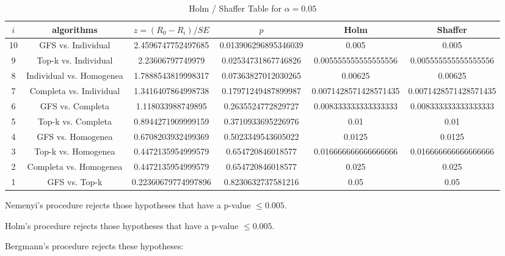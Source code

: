 \documentclass[a4paper,10pt]{article}
\begin{document}
\begin{landscape}
\begin{table}[!htp]
\centering\tiny
\caption{Holm / Shaffer Table for $\alpha=0.05$}
\begin{tabular}{cccccc}
$i$&algorithms&$z=(R_0 - R_i)/SE$&$p$&Holm&Shaffer\\
\hline
10&GFS vs. Individual&2.4596747752497685&0.013906296895346039&0.005&0.005\\
9&Top-k vs. Individual&2.23606797749979&0.02534731867746826&0.005555555555555556&0.005555555555555556\\
8&Individual vs. Homogenea&1.7888543819998317&0.07363827012030265&0.00625&0.00625\\
7&Completa vs. Individual&1.3416407864998738&0.17971249487899987&0.0071428571428571435&0.0071428571428571435\\
6&GFS vs. Completa&1.118033988749895&0.2635524772829727&0.008333333333333333&0.008333333333333333\\
5&Top-k vs. Completa&0.8944271909999159&0.3710933695226976&0.01&0.01\\
4&GFS vs. Homogenea&0.6708203932499369&0.5023349543605022&0.0125&0.0125\\
3&Top-k vs. Homogenea&0.4472135954999579&0.654720846018577&0.016666666666666666&0.016666666666666666\\
2&Completa vs. Homogenea&0.4472135954999579&0.654720846018577&0.025&0.025\\
1&GFS vs. Top-k&0.22360679774997896&0.8230632737581216&0.05&0.05\\
\hline
\end{tabular}
\end{table}
Nemenyi's procedure rejects those hypotheses that have a p-value $\le0.005$.


Holm's procedure rejects those hypotheses that have a p-value $\le0.005$.


Bergmann's procedure rejects these hypotheses:


\begin{itemize}


\end{itemize}



\end{landscape}
\end{document}
